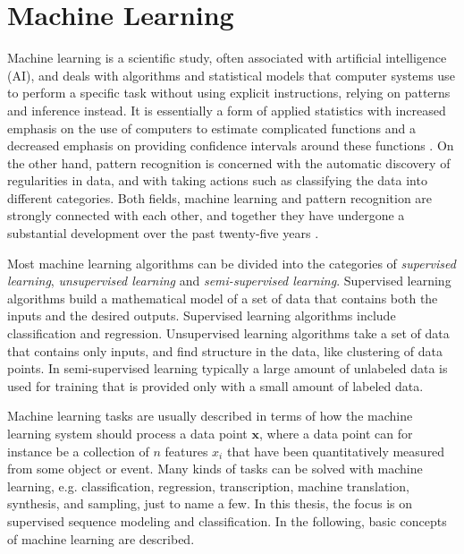 \documentclass{scrartcl}
\begin{document}




\newpage

\section{Machine Learning}
\label{sec:machine_learning}

Machine learning is a scientific study, often associated with artificial intelligence (AI), and deals with algorithms and statistical models that computer systems use to perform a specific task without using explicit instructions, relying on patterns and inference instead. It is essentially a form of applied statistics with increased emphasis on the use of computers to estimate complicated functions and a decreased emphasis on providing confidence intervals around these functions \cite{Goodfellow2016}. On the other hand, pattern recognition is concerned with the automatic discovery of regularities in data, and with taking actions such as classifying the data into different categories. Both fields, machine learning and pattern recognition are strongly connected with each other, and together they have undergone a substantial development over the past twenty-five years \cite{Bishop2006}.

Most machine learning algorithms can be divided into the categories of \emph{supervised learning}, \emph{unsupervised learning} and \emph{semi-supervised learning}. Supervised learning algorithms build a mathematical model of a set of data that contains both the inputs and the desired outputs. Supervised learning algorithms include classification and regression. Unsupervised learning algorithms take a set of data that contains only inputs, and find structure in the data, like clustering of data points. In semi-supervised learning typically a large amount of unlabeled data is used for training that is provided only with a small amount of labeled data.

Machine learning tasks are usually described in terms of how the machine learning system should process a data point $\mathbf x$, where a data point can for instance be a collection of $n$ features $x_i$ that have been quantitatively measured from some object or event. Many kinds of tasks can be solved with machine learning, e.g. classification, regression, transcription, machine translation, synthesis, and sampling, just to name a few. In this thesis, the focus is on supervised sequence modeling and classification. In the following, basic concepts of machine learning are described. 
\end{document}
